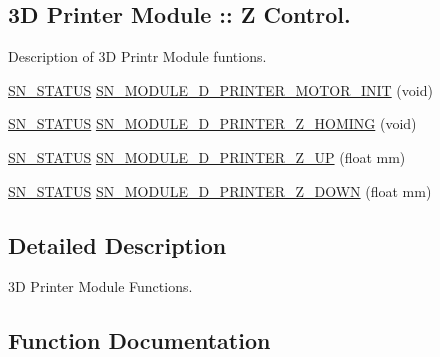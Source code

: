 \subsection*{3D Printer Module \+:\+: Z Control.}
\label{_amgrp0b5aafc53c5099dcb4016e710d2ae272}%
Description of 3D Printr Module funtions. \begin{DoxyCompactItemize}
\item 
\hyperlink{group__SYSTEM__ERROR_ga4540713b9a7a18ce44d78c3a10f7442f}{S\+N\+\_\+\+S\+T\+A\+T\+US} \hyperlink{group__MODULE__3D__PRINTER_gafc569784fa8758bec7c2f90b1a7f1404}{S\+N\+\_\+\+M\+O\+D\+U\+L\+E\+\_\+D\+\_\+\+P\+R\+I\+N\+T\+E\+R\+\_\+\+M\+O\+T\+O\+R\+\_\+\+I\+N\+IT} (void)
\item 
\hyperlink{group__SYSTEM__ERROR_ga4540713b9a7a18ce44d78c3a10f7442f}{S\+N\+\_\+\+S\+T\+A\+T\+US} \hyperlink{group__MODULE__3D__PRINTER_gafa7b9a2a41989695e1b881b984794432}{S\+N\+\_\+\+M\+O\+D\+U\+L\+E\+\_\+D\+\_\+\+P\+R\+I\+N\+T\+E\+R\+\_\+\+Z\+\_\+\+H\+O\+M\+I\+NG} (void)
\item 
\hyperlink{group__SYSTEM__ERROR_ga4540713b9a7a18ce44d78c3a10f7442f}{S\+N\+\_\+\+S\+T\+A\+T\+US} \hyperlink{group__MODULE__3D__PRINTER_ga4671a91d49ef53f67f1d203f18355c63}{S\+N\+\_\+\+M\+O\+D\+U\+L\+E\+\_\+D\+\_\+\+P\+R\+I\+N\+T\+E\+R\+\_\+\+Z\+\_\+\+UP} (float mm)
\item 
\hyperlink{group__SYSTEM__ERROR_ga4540713b9a7a18ce44d78c3a10f7442f}{S\+N\+\_\+\+S\+T\+A\+T\+US} \hyperlink{group__MODULE__3D__PRINTER_ga5747a0d753cb9d79747db6f4a22b18e9}{S\+N\+\_\+\+M\+O\+D\+U\+L\+E\+\_\+D\+\_\+\+P\+R\+I\+N\+T\+E\+R\+\_\+\+Z\+\_\+\+D\+O\+WN} (float mm)
\end{DoxyCompactItemize}


\subsection{Detailed Description}
3D Printer Module Functions. 



\subsection{Function Documentation}
\mbox{\label{group__MODULE__3D__PRINTER_ga801e265ffe6f8c56081112f4fdd35f39}} 

